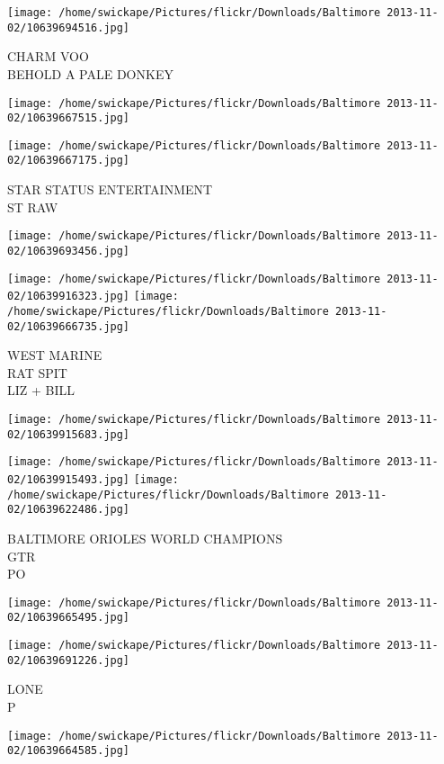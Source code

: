 \documentclass[10pt,letterpaper]{article}
\begin{document}
\vspace{0.25in}
\texttt{[image: /home/swickape/Pictures/flickr/Downloads/Baltimore 2013-11-02/10639694516.jpg]}

CHARM VOO\\
BEHOLD A PALE DONKEY
\pagebreak

\texttt{[image: /home/swickape/Pictures/flickr/Downloads/Baltimore 2013-11-02/10639667515.jpg]}

\vspace{0.25in}
\texttt{[image: /home/swickape/Pictures/flickr/Downloads/Baltimore 2013-11-02/10639667175.jpg]}

STAR STATUS ENTERTAINMENT\\
ST RAW
\pagebreak

\texttt{[image: /home/swickape/Pictures/flickr/Downloads/Baltimore 2013-11-02/10639693456.jpg]}

\vspace{0.25in}
\texttt{[image: /home/swickape/Pictures/flickr/Downloads/Baltimore 2013-11-02/10639916323.jpg]}
\texttt{[image: /home/swickape/Pictures/flickr/Downloads/Baltimore 2013-11-02/10639666735.jpg]}

WEST MARINE\\
RAT SPIT\\
LIZ + BILL
\pagebreak

\texttt{[image: /home/swickape/Pictures/flickr/Downloads/Baltimore 2013-11-02/10639915683.jpg]}

\vspace{0.25in}
\texttt{[image: /home/swickape/Pictures/flickr/Downloads/Baltimore 2013-11-02/10639915493.jpg]}
\texttt{[image: /home/swickape/Pictures/flickr/Downloads/Baltimore 2013-11-02/10639622486.jpg]}

BALTIMORE ORIOLES WORLD CHAMPIONS\\
GTR\\
PO
\pagebreak

\texttt{[image: /home/swickape/Pictures/flickr/Downloads/Baltimore 2013-11-02/10639665495.jpg]}

\vspace{0.25in}
\texttt{[image: /home/swickape/Pictures/flickr/Downloads/Baltimore 2013-11-02/10639691226.jpg]}

LONE\\
P
\pagebreak

\texttt{[image: /home/swickape/Pictures/flickr/Downloads/Baltimore 2013-11-02/10639664585.jpg]}
\end{document}
